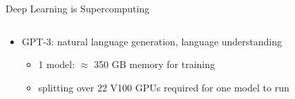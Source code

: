 \begin{frame}{Deep Learning is Supercomputing}
\protect\hypertarget{deep-learning-is-supercomputing-5}{}
\begin{columns}[T]
\begin{column}{0.4\textwidth}
\begin{itemize}
\tightlist
\item
  GPT-3: natural language generation, language understanding

  \begin{itemize}
  \tightlist
  \item
    1 model: \(\approx\) 350 GB memory for training
  \item
    splitting over 22 V100 GPUs required for one model to run
  \end{itemize}
\end{itemize}
\end{column}

\begin{column}{0.6\textwidth}
\vspace*{2cm}
\end{column}
\end{columns}
\end{frame}

